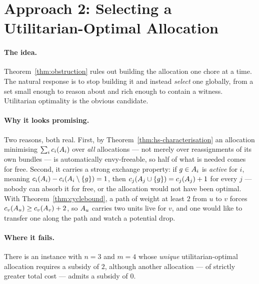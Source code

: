 \section{Approach 2: Selecting a Utilitarian-Optimal Allocation}
\label{sec:approach2}

\paragraph{The idea.} Theorem~\ref{thm:obstruction} rules out building the
allocation one chore at a time. The natural response is to stop building it and
instead \emph{select} one globally, from a set small enough to reason about and
rich enough to contain a witness. Utilitarian optimality is the obvious
candidate.

\paragraph{Why it looks promising.} Two reasons, both real. First, by
Theorem~\ref{thm:hs-characterisation} an allocation minimising $\sum_i
c_i(A_{i})$ over \emph{all} allocations --- not merely over
reassignments of its own bundles --- is automatically envy-freeable, so half of
what is needed comes for free. Second, it carries a strong exchange property: if
$g \in A_{i}$ is \emph{active} for $i$, meaning $c_i(A_{i}) -
c_i(A_{i} \setminus \left\{g\right\}) = 1$, then $c_j(A_{j} \cup
\left\{g\right\}) = c_j(A_{j}) + 1$ for every $j$ --- nobody can absorb it for
free, or the allocation would not have been optimal. With
Theorem~\ref{thm:cyclebound}, a path of weight at least $2$ from $u$ to $v$
forces $c_v(A_{u}) \ge c_v(A_{v}) + 2$, so $A_{u}$ carries
two units live for $v$, and one would like to transfer one along the path and
watch a potential drop.

\paragraph{Where it fails.}

\begin{proposition}
\label{prop:msw-false}
There is an instance with $n = 3$ and $m = 4$ whose \emph{unique}
utilitarian-optimal allocation requires a subsidy of $2$, although another
allocation --- of strictly greater total cost --- admits a subsidy of $0$.
\end{proposition}

